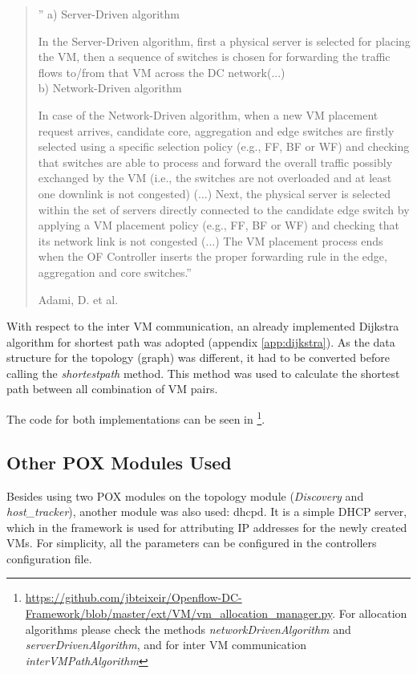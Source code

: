 \documentclass[12pt,english,oneside]{book}
\begin{document}
\begin{quotation}
''
a) Server-Driven algorithm

In the Server-Driven algorithm, first a physical server is selected for placing the VM, then a sequence of switches is chosen for forwarding the traffic flows to/from that VM across the DC network(...)\\

b) Network-Driven algorithm

In case of the Network-Driven algorithm, when a new VM placement request arrives, candidate core, aggregation and edge switches are firstly selected using a specific selection policy (e.g., FF, BF or WF) and checking that switches are able to process and forward the overall traffic possibly exchanged by the VM (i.e., the switches are not overloaded and at least one downlink is not congested) (...) Next, the physical server is selected within the set of servers directly connected to the candidate edge switch by applying a VM placement policy (e.g., FF, BF or WF) and checking that its network link is not congested (...) The VM placement process ends when the OF Controller inserts the proper forwarding rule in the edge, aggregation and core switches.''

\hfill Adami, D. et al.\cite{im2013}
\end{quotation}

With respect to the inter VM communication, an already implemented Dijkstra algorithm for shortest path was adopted (appendix \ref{app:dijkstra}). As the data structure for the topology (graph) was different, it had to be converted before calling the \textit{shortestpath} method. This method was used to calculate the shortest path between all combination of VM pairs.

The code for both implementations can be seen in \footnote{\url{https://github.com/jbteixeir/Openflow-DC-Framework/blob/master/ext/VM/vm\_allocation\_manager.py}. For allocation algorithms please check the methods \textit{networkDrivenAlgorithm} and \textit{serverDrivenAlgorithm}, and for inter VM communication \textit{interVMPathAlgorithm}}.

\subsection{Other POX Modules Used}
\hspace{0.6cm}

Besides using two POX modules on the topology module (\textit{Discovery} and \textit{host\_tracker}), another module was also used: dhcpd.
It is a simple DHCP server, which in the framework is used for attributing IP addresses for the newly created VMs.
For simplicity, all the parameters can be configured in the controllers configuration file.
\end{document}
